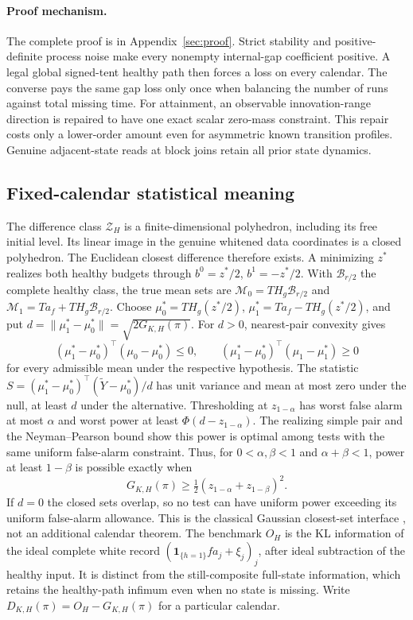 \documentclass[11pt]{article}
\begin{document}
\paragraph{Proof mechanism.}
The complete proof is in Appendix~\ref{sec:proof}.
Strict stability and positive-definite process noise make every nonempty
internal-gap coefficient positive. A legal global signed-tent healthy path
then forces a loss on every calendar. The converse pays the same gap loss
only once when balancing the number of runs against total missing time.
For attainment, an observable innovation-range direction is repaired to have
one exact scalar zero-mass constraint. This repair costs only a lower-order
amount even for asymmetric known transition profiles. Genuine adjacent-state
reads at block joins retain all prior state dynamics.

\subsection{Fixed-calendar statistical meaning}
The difference class $\mathcal Z_H$ is a finite-dimensional polyhedron, including
its free initial level. Its linear image in the genuine whitened data coordinates
is a closed polyhedron. The Euclidean closest difference therefore exists.
A minimizing $z^*$ realizes both healthy budgets through
$b^0=z^*/2$, $b^1=-z^*/2$. With $\mathcal B_{r/2}$ the complete healthy class,
the true mean sets are $\mathcal M_0=T H_g\mathcal B_{r/2}$ and
$\mathcal M_1=T a_f+T H_g\mathcal B_{r/2}$.
Choose $\mu_0^*=T H_g(z^*/2)$, $\mu_1^*=T a_f-T H_g(z^*/2)$, and put
$d=\|\mu_1^*-\mu_0^*\|=\sqrt{2G_{K,H}(\pi)}$.
For $d>0$, nearest-pair convexity gives
\[
(\mu_1^*-\mu_0^*)^\top(\mu_0-\mu_0^*)\le0,\qquad
(\mu_1^*-\mu_0^*)^\top(\mu_1-\mu_1^*)\ge0
\]
for every admissible mean under the respective hypothesis.
The statistic
$S=(\mu_1^*-\mu_0^*)^\top(\widetilde Y-\mu_0^*)/d$
has unit variance and mean at most zero under the null, at least $d$ under
the alternative. Thresholding at $z_{1-\alpha}$ has worst false alarm
at most $\alpha$ and worst power at least
$\Phi(d-z_{1-\alpha})$.
The realizing simple pair and the Neyman--Pearson bound show this power is
optimal among tests with the same uniform false-alarm constraint.
Thus, for $0<\alpha,\beta<1$ and $\alpha+\beta<1$, power at least
$1-\beta$ is possible exactly when
\[
G_{K,H}(\pi)\ge\tfrac12(z_{1-\alpha}+z_{1-\beta})^2.
\]
If $d=0$ the closed sets overlap, so no test can have uniform power exceeding
its uniform false-alarm allowance. This is the classical Gaussian closest-set
interface \cite{convex}, not an additional calendar theorem.
The benchmark $O_H$ is the KL information of the ideal complete white record
$(\mathbf1_{\{h=1\}}fa_j+\xi_j)_j$, after ideal subtraction of the healthy input.
It is distinct from the still-composite full-state information, which retains
the healthy-path infimum even when no state is missing.
Write $D_{K,H}(\pi)=O_H-G_{K,H}(\pi)$ for a particular calendar.
\end{document}
